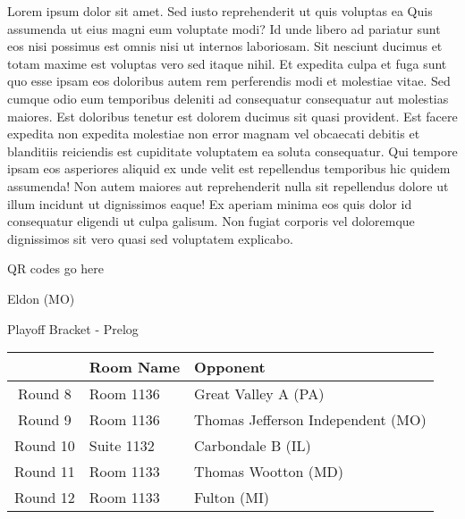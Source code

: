 \documentclass{article}%
\begin{document}
\vspace*{8pt}%
\linebreak%
\newline%
\newline%
Lorem ipsum dolor sit amet. Sed iusto reprehenderit ut quis voluptas ea Quis assumenda ut eius magni eum voluptate modi? Id unde libero ad pariatur sunt eos nisi possimus est omnis nisi ut internos laboriosam. Sit nesciunt ducimus et totam maxime est voluptas vero sed itaque nihil. Et expedita culpa et fuga sunt quo esse ipsam eos doloribus autem rem perferendis modi et molestiae vitae.\newline%
\newline%
Sed cumque odio eum temporibus deleniti ad consequatur consequatur aut molestias maiores. Est doloribus tenetur est dolorem ducimus sit quasi provident. Est facere expedita non expedita molestiae non error magnam vel obcaecati debitis et blanditiis reiciendis est cupiditate voluptatem ea soluta consequatur. Qui tempore ipsam eos asperiores aliquid ex unde velit est repellendus temporibus hic quidem assumenda!\newline%
\newline%
Non autem maiores aut reprehenderit nulla sit repellendus dolore ut illum incidunt ut dignissimos eaque! Ex aperiam minima eos quis dolor id consequatur eligendi ut culpa galisum. Non fugiat corporis vel doloremque dignissimos sit vero quasi sed voluptatem explicabo.\newline%
\newline%
%
\vspace*{30pt}%
\begin{center}%
\begin{Huge}%
QR codes go here%
\end{Huge}%
\end{center}%
\newpage%
\begin{center}%
\begin{Huge}%
Eldon (MO)%
\end{Huge}%
\vspace*{8pt}%
\linebreak%
\begin{Large}%
Playoff Bracket {-} Prelog%
\end{Large}%
\end{center}%
%
\begin{tabularx}{\textwidth}{|c|Y|Y|}%
\hline%
&Room Name&Opponent\\%
\hline%
Round 8&Room 1136&Great Valley A (PA)\\%
Round 9&Room 1136&Thomas Jefferson Independent (MO)\\%
Round 10&Suite 1132&Carbondale B (IL)\\%
Round 11&Room 1133&Thomas Wootton (MD)\\%
Round 12&Room 1133&Fulton (MI)\\%
\hline%
\end{tabularx}%
\end{document}
